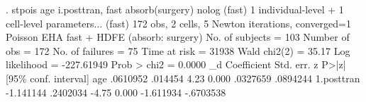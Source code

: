 . stpois age i.posttran, fast absorb(surgery) nolog
  (fast) 1 individual-level + 1 cell-level parameters...
  (fast) 172 obs, 2 cells, 5 Newton iterations, converged=1
{\smallskip}
Poisson EHA {\EMDASH} fast + HDFE (absorb: surgery)
{\smallskip}
No. of subjects =          103                  Number of obs   =      172
No. of failures =           75
Time at risk    =        31938                  Wald chi2(2)    =    35.17
Log likelihood  =   -227.61949                  Prob > chi2     =   0.0000
{\smallskip}
          _d {\VBAR} Coefficient  Std. err.      z    P>|z|     [95\% conf. interval]
         age {\VBAR}   .0610952    .014454     4.23   0.000     .0327659    .0894244
  1.posttran {\VBAR}  -1.141144   .2402034    -4.75   0.000    -1.611934   -.6703538

